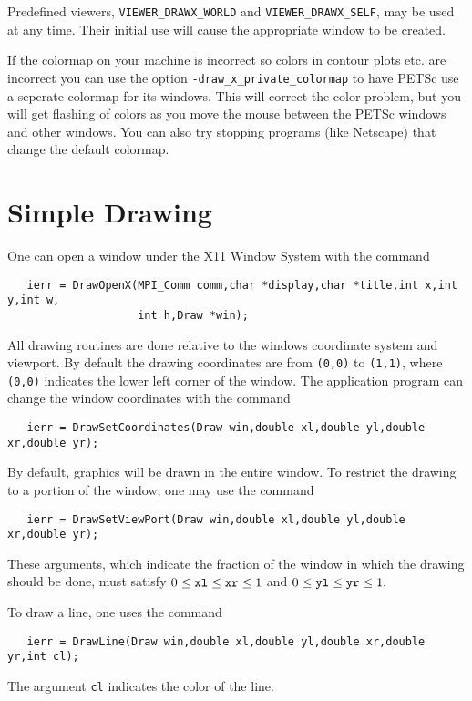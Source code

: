  
Predefined viewers, {\tt VIEWER\_DRAWX\_WORLD} 
and {\tt VIEWER\_DRAWX\_SELF}, may be used at any time. Their initial
use will cause the appropriate window to be created.

\medskip
If the colormap on your machine is incorrect so colors in contour plots etc.
are incorrect you can use the option {\tt -draw\_x\_private\_colormap} 
 to have PETSc use a seperate colormap
for its windows. This will correct the color problem, but you will get
flashing of colors as you move the mouse between the PETSc windows and other 
windows. You can also try stopping programs (like Netscape) that change the 
default colormap.

\section{Simple Drawing}

One can open a window under the X11 Window System with the
command  
\begin{verbatim}
   ierr = DrawOpenX(MPI_Comm comm,char *display,char *title,int x,int y,int w,
                    int h,Draw *win);
\end{verbatim}
All drawing routines are done relative to the windows coordinate system 
and viewport. By default the drawing coordinates are from {\tt (0,0)} to 
{\tt (1,1)}, where {\tt (0,0)} indicates the lower left corner of the 
window. The application program can change the window coordinates with the 
command  
\begin{verbatim}
   ierr = DrawSetCoordinates(Draw win,double xl,double yl,double xr,double yr);
\end{verbatim}
By default, graphics will be drawn in the entire window. To restrict the 
drawing to a portion of the window, one may 
use the command 
\begin{verbatim}
   ierr = DrawSetViewPort(Draw win,double xl,double yl,double xr,double yr);
\end{verbatim}
These arguments, which indicate the fraction of the window in which the 
drawing should be done, must satisfy 
$0 \le {\tt xl} \le {\tt xr} \le 1 $ and $ 0 \le {\tt yl} \le {\tt yr} \le 1.$ 

To draw a line, one uses
 the command  
\begin{verbatim}
   ierr = DrawLine(Draw win,double xl,double yl,double xr,double yr,int cl);
\end{verbatim}
The argument {\tt cl} indicates the color of the line.

